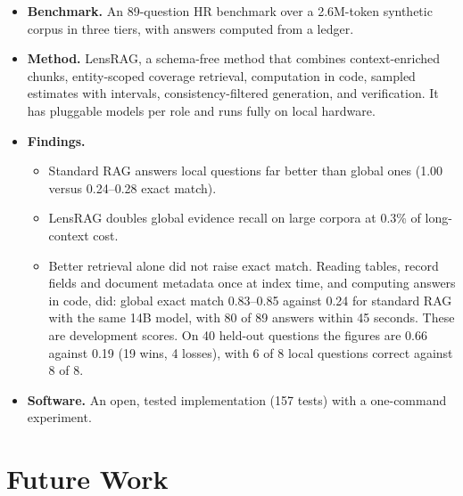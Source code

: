 \documentclass[11pt,letterpaper,oneside]{report}
\begin{document}
\begin{itemize}
  \item \textbf{Benchmark.} An 89-question HR benchmark over a 2.6M-token
  synthetic corpus in three tiers, with answers computed from a ledger.
  \item \textbf{Method.} LensRAG, a schema-free method that combines
  context-enriched chunks, entity-scoped coverage retrieval, computation in
  code, sampled estimates with intervals, consistency-filtered generation,
  and verification. It has pluggable models per role and runs fully on
  local hardware.
  \item \textbf{Findings.}
  \begin{itemize}
    \item Standard RAG answers local questions far better than global ones
    (1.00 versus 0.24--0.28 exact match).
    \item LensRAG doubles global evidence recall on large corpora at 0.3\% of
    long-context cost.
    \item Better retrieval alone did not raise exact match. Reading tables,
    record fields and document metadata once at index time, and computing
    answers in code, did: global exact match 0.83--0.85 against 0.24 for
    standard RAG with the same 14B model, with 80 of 89 answers within 45
    seconds. These are development scores. On 40 held-out questions the
    figures are 0.66 against 0.19 (19 wins, 4 losses), with 6 of 8 local
    questions correct against 8 of 8.
  \end{itemize}
  \item \textbf{Software.} An open, tested implementation (157 tests) with a
  one-command experiment.
\end{itemize}

\section{Future Work}
\label{sec:future}
\end{document}
